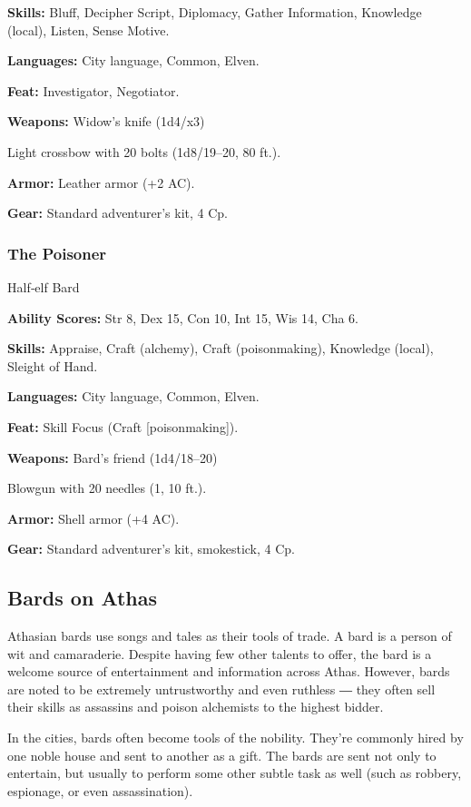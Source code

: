 \documentclass[10pt,a4paper,twocolumn]{d20}
\begin{document}
{\textbf{Skills:} Bluff, Decipher Script, Diplomacy, Gather Information, Knowledge (local), Listen, Sense Motive.

\textbf{Languages:} City language, Common, Elven.

\textbf{Feat:} Investigator, Negotiator.

\textbf{Weapons:} Widow’s knife (1d4/x3)

Light crossbow with 20 bolts (1d8/19–20, 80 ft.).

\textbf{Armor:} Leather armor (+2 AC).

\textbf{Gear:} Standard adventurer’s kit, 4 Cp.

\subsubsection{The Poisoner}

Half‐elf Bard

\textbf{Ability Scores:} Str 8, Dex 15, Con 10, Int 15, Wis 14, Cha 6.

\textbf{Skills:} Appraise, Craft (alchemy), Craft (poisonmaking), Knowledge (local), Sleight of Hand.

\textbf{Languages:} City language, Common, Elven.

\textbf{Feat:} Skill Focus (Craft [poisonmaking]).

\textbf{Weapons:} Bard’s friend (1d4/18–20)

Blowgun with 20 needles (1, 10 ft.).

\textbf{Armor:} Shell armor (+4 AC).

\textbf{Gear:} Standard adventurer’s kit, smokestick, 4 Cp.

\subsection{Bards on Athas}

Athasian bards use songs and tales as their tools of trade. A bard is a person of wit and camaraderie. Despite having few other talents to offer, the bard is a welcome source of entertainment and information across Athas. However, bards are noted to be extremely untrustworthy and even ruthless ― they often sell their skills as assassins and poison alchemists to the highest bidder.

In the cities, bards often become tools of the nobility. They’re commonly hired by one noble house and sent to another as a gift. The bards are sent not only to entertain, but usually to perform some other subtle task as well (such as robbery, espionage, or even assassination).

}
\end{document}

